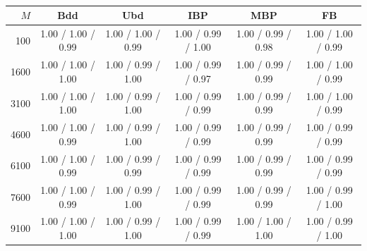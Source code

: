 \begin{table}[ht!]
    \centering
    \small
    \begin{tabular}{r c c c c c}
    \hline
    $M$ & Bdd & Ubd & IBP & MBP & FB \\
    \hline
    100 & 1.00 / 1.00 / 0.99 & 1.00 / 1.00 / 0.99 & 1.00 / 0.99 / 1.00 & 1.00 / 0.99 / 0.98 & 1.00 / 1.00 / 0.99 \\
    1600 & 1.00 / 1.00 / 1.00 & 1.00 / 0.99 / 1.00 & 1.00 / 0.99 / 0.97 & 1.00 / 0.99 / 0.99 & 1.00 / 1.00 / 0.99 \\
    3100 & 1.00 / 1.00 / 1.00 & 1.00 / 0.99 / 1.00 & 1.00 / 0.99 / 0.99 & 1.00 / 0.99 / 0.99 & 1.00 / 1.00 / 0.99 \\
    4600 & 1.00 / 1.00 / 0.99 & 1.00 / 0.99 / 1.00 & 1.00 / 0.99 / 0.99 & 1.00 / 0.99 / 0.99 & 1.00 / 0.99 / 0.99 \\
    6100 & 1.00 / 1.00 / 0.99 & 1.00 / 0.99 / 0.99 & 1.00 / 0.99 / 0.99 & 1.00 / 0.99 / 0.99 & 1.00 / 0.99 / 0.99 \\
    7600 & 1.00 / 1.00 / 0.99 & 1.00 / 0.99 / 1.00 & 1.00 / 0.99 / 0.99 & 1.00 / 0.99 / 0.99 & 1.00 / 0.99 / 1.00 \\
    9100 & 1.00 / 1.00 / 1.00 & 1.00 / 0.99 / 1.00 & 1.00 / 0.99 / 0.99 & 1.00 / 1.00 / 1.00 & 1.00 / 0.99 / 1.00 \\
    \hline
    \end{tabular}
    \caption{}
    \label{tab:Exp1_features_geom}
\end{table}
